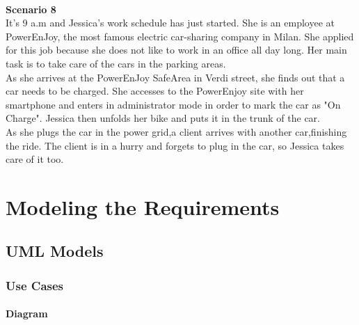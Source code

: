 \documentclass[11pt,a4paper]{report}
\begin{document}
\noindent \\
\textbf{Scenario 8}\\
It's 9 a.m and Jessica's work schedule has just started. She is an employee at PowerEnJoy, the most famous electric car-sharing company in Milan. She applied for this job because she does not like to work in an office all day long. Her main task is to take care of the cars in the parking areas.\\
As she arrives at the PowerEnJoy SafeArea in Verdi street, she finds out that a car needs to be charged. She accesses to the PowerEnjoy site with her smartphone and enters in administrator mode in order to mark the car as "On Charge". Jessica then unfolds her bike and puts it in the trunk of the car.\\
As she plugs the car in the power grid,a client arrives with another car,finishing the ride. The client is in a hurry and forgets to plug in the car, so Jessica takes care of it too.
\\

\chapter{Modeling the Requirements}
\section{UML Models}

\subsection{Use Cases}
\subsubsection{Diagram}
\end{document}
